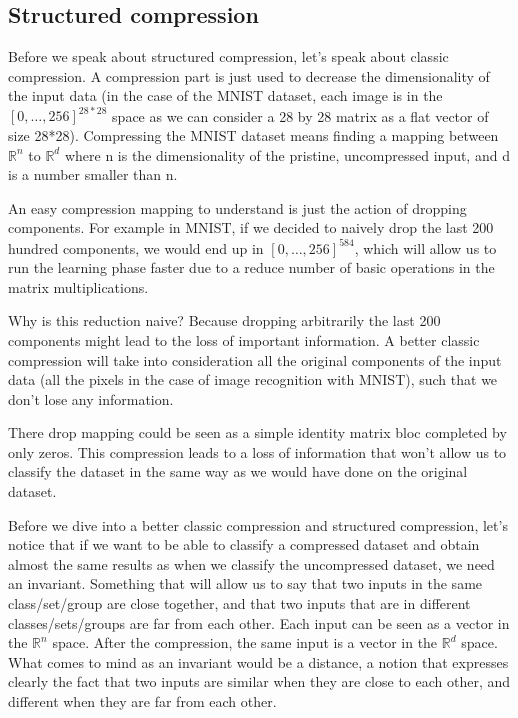 \documentclass[11pt,a4paper]{article}
\begin{document}
	\subsection{Structured compression}
	Before we speak about structured compression, let's speak about classic compression. A compression part is just used to decrease the dimensionality of the input data (in the case of the MNIST dataset, each image is in the $[0, \dots, 256]^{28*28}$ space as we can consider a 28 by 28 matrix as a flat vector of size 28*28). Compressing the MNIST dataset means finding a mapping between $\mathbb{R}^n$ to $\mathbb{R}^d$ where n is the dimensionality of the pristine, uncompressed input, and d is a number smaller than n.
	
	
	An easy compression mapping to understand is just the action of dropping components. For example in MNIST, if we decided to naively drop the last 200 hundred components, we would end up in $[0,\dots, 256]^584$, which will allow us to run the learning phase faster due to a reduce number of basic operations in the matrix multiplications.
	
	
	Why is this reduction naive? Because dropping arbitrarily the last 200 components might lead to the loss of important information. A better classic compression will take into consideration all the original components of the input data (all the pixels in the case of image recognition with MNIST), such that we don't lose any information.
	
	
	There drop mapping could be seen as a simple identity matrix bloc completed by only zeros. This compression leads to a loss of information that won't allow us to classify the dataset in the same way as we would have done on the original dataset.
	
	Before we dive into a better classic compression and structured compression, let's notice that if we want to be able to classify a compressed dataset and obtain almost the same results as when we classify the uncompressed dataset, we need an invariant. Something that will allow us to say that two inputs in the same class/set/group are close together, and that two inputs that are in different classes/sets/groups are far from each other. Each input can be seen as a vector in the $\mathbb{R}^n$ space. After the compression, the same input is a vector in the $\mathbb{R}^d$ space. What comes to mind as an invariant would be a distance, a notion that expresses clearly the fact that two inputs are similar when they are close to each other, and different when they are far from each other.
	
\end{document}
